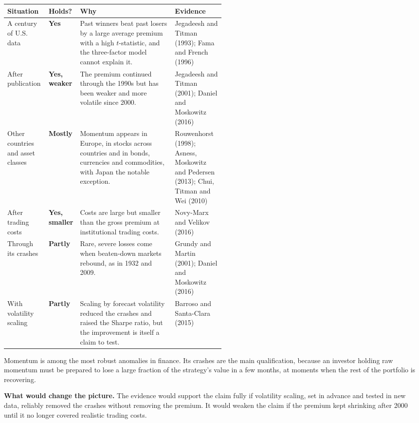 \begin{center}
\small
\begin{tabularx}{\linewidth}{@{}>{\raggedright\arraybackslash}p{0.19\linewidth}>{\raggedright\arraybackslash}p{0.10\linewidth}>{\raggedright\arraybackslash}X>{\raggedright\arraybackslash}p{0.23\linewidth}@{}}
\toprule
Situation & Holds? & Why & Evidence \\
\midrule
A century of U.S. data & \textbf{Yes} & Past winners beat past losers by a large average premium with a high $t$-statistic, and the three-factor model cannot explain it. & Jegadeesh and Titman (1993); Fama and French (1996) \\
\addlinespace[3pt]
After publication & \textbf{Yes, weaker} & The premium continued through the 1990s but has been weaker and more volatile since 2000. & Jegadeesh and Titman (2001); Daniel and Moskowitz (2016) \\
\addlinespace[3pt]
Other countries and asset classes & \textbf{Mostly} & Momentum appears in Europe, in stocks across countries and in bonds, currencies and commodities, with Japan the notable exception. & Rouwenhorst (1998); Asness, Moskowitz and Pedersen (2013); Chui, Titman and Wei (2010) \\
\addlinespace[3pt]
After trading costs & \textbf{Yes, smaller} & Costs are large but smaller than the gross premium at institutional trading costs. & Novy-Marx and Velikov (2016) \\
\addlinespace[3pt]
Through its crashes & \textbf{Partly} & Rare, severe losses come when beaten-down markets rebound, as in 1932 and 2009. & Grundy and Martin (2001); Daniel and Moskowitz (2016) \\
\addlinespace[3pt]
With volatility scaling & \textbf{Partly} & Scaling by forecast volatility reduced the crashes and raised the Sharpe ratio, but the improvement is itself a claim to test. & Barroso and Santa-Clara (2015) \\
\bottomrule
\end{tabularx}
\end{center}

Momentum is among the most robust anomalies in finance. Its crashes are the main qualification, because an investor holding raw momentum must be prepared to lose a large fraction of the strategy's value in a few months, at moments when the rest of the portfolio is recovering.

\textbf{What would change the picture.} The evidence would support the claim fully if volatility scaling, set in advance and tested in new data, reliably removed the crashes without removing the premium. It would weaken the claim if the premium kept shrinking after 2000 until it no longer covered realistic trading costs.

